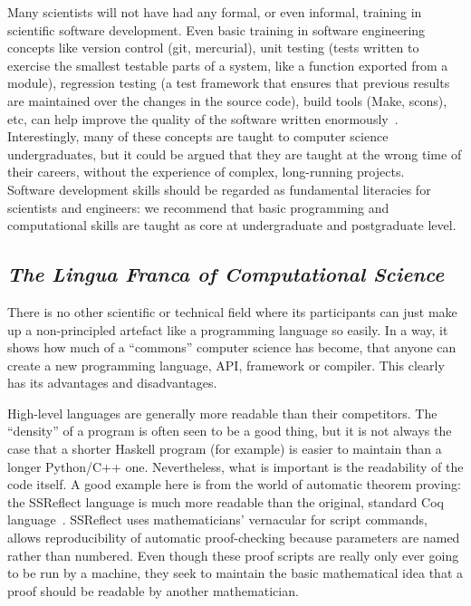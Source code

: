 \documentclass[a4paper,11pt]{article}
\begin{document}
Many scientists will not have had any formal, or even informal,
training in scientific software development. Even basic training in
software engineering concepts like version control (git, mercurial),
unit testing (tests written to exercise the smallest testable parts of
a system, like a function exported from a module), regression testing
(a test framework that ensures that previous results are maintained
over the changes in the source code), build tools (Make, scons), etc,
can help improve the quality of the software written
enormously~\cite{wilson2006}.  Interestingly, many of these concepts
are taught to computer science undergraduates, but it could be argued
that they are taught at the wrong time of their careers, without the
experience of complex,
long-running projects.\\

 Software
development skills should be regarded as fundamental literacies for
scientists and engineers: we recommend that basic programming and
computational skills are taught as core at undergraduate and
postgraduate level.

\subsection{{\emph{The Lingua Franca of Computational Science}}}

There is no other scientific or technical field where its participants
can just make up a non-principled artefact like a programming language
so easily. In a way, it shows how much of a ``commons'' computer
science has become, that anyone can create a new programming language,
API, framework or compiler. This clearly has its advantages and
disadvantages.

High-level languages are generally more readable than their
competitors. The ``density'' of a program is often seen to be a good
thing, but it is not always the case that a shorter Haskell program
(for example) is easier to maintain than a longer Python/C++
one. Nevertheless, what is important is the readability of the code
itself. A good example here is from the world of automatic theorem
proving: the SSReflect language is much more readable than the
original, standard Coq language~\cite{GonthierZND13}. SSReflect uses
mathematicians' vernacular for script commands, allows reproducibility
of automatic proof-checking because parameters are named rather than
numbered.  Even though these proof scripts are really only ever going
to be run by a machine, they seek to maintain the basic mathematical
idea that a proof should be readable by another mathematician.
\end{document}
